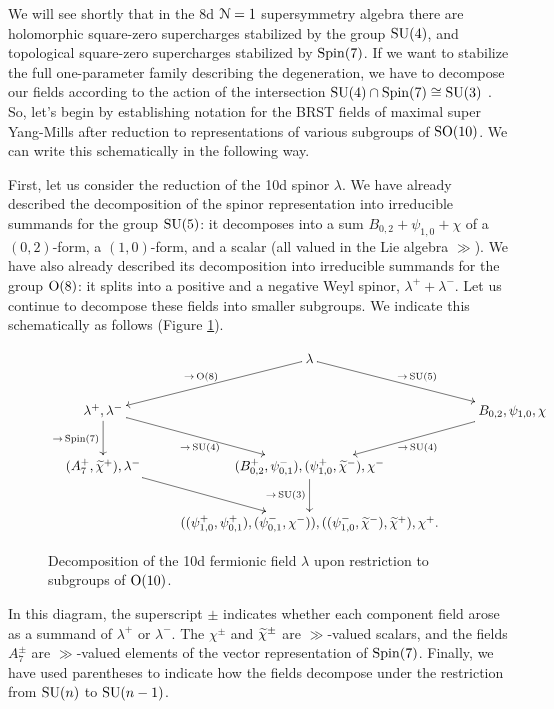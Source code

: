 \documentclass[10pt, oneside]{article}
\begin{document}
We will see shortly that in the 8d $\mathcal{N}=1$ supersymmetry algebra there are holomorphic square-zero supercharges stabilized by the group $\mathrm{SU}(4)$, and topological square-zero supercharges stabilized by $\mathrm{Spin}(7)$.  If we want to stabilize the full one-parameter family describing the degeneration, we have to decompose our fields according to the action of the intersection $\mathrm{SU}(4) \cap \mathrm{Spin}(7) \cong \mathrm{SU}(3)$ .  So, let's begin by establishing notation for the BRST fields of maximal super Yang-Mills after reduction to representations of various subgroups of $\mathrm{SO}(10)$.  We can write this schematically in the following way.

First, let us consider the reduction of the 10d spinor $\lambda$.  We have already described the decomposition of the spinor representation into irreducible summands for the group $\mathrm{SU}(5)$: it decomposes into a sum $B_{0,2} + \psi_{1,0} + \chi$ of a $(0,2)$-form, a $(1,0)$-form, and a scalar (all valued in the Lie algebra $\gg$).  We have also already described its decomposition into irreducible summands for the group $\mathrm{O}(8)$: it splits into a positive and a negative Weyl spinor, $\lambda^+ + \lambda^-$.  Let us continue to decompose these fields into smaller subgroups.  We indicate this schematically as follows (Figure \ref{fig:8dfermiondecomp}).
\begin{figure}[!h]
\[
\xymatrix{
&\lambda \ar[dl]_{\to\,  \mr{O}(8)} \ar[dr]^{\to\,  \SU(5)} &\\
\lambda^+, \lambda^- \ar[dr]_{\to\,  \SU(4)} \ar[d]_{\to\,  \Spin(7)} &&B_{0,2}, \psi_{1,0}, \chi \ar[dl]^{\to\,  \SU(4)} \\
(A_7^+, \wt \chi^+), \lambda^- \ar[dr] &(B_{0,2}^+, \psi_{0,1}^-), (\psi_{1,0}^+, \wt \chi^-), \chi^- \ar[d]_{\to\,  \SU(3)} &\\
 &((\psi_{1,0}^+, \psi_{0,1}^+), (\psi_{0,1}^-, \chi^-)), ((\psi_{1,0}^-, \wt \chi^-), \wt \chi^+), \chi^+. &
}\]
\caption{Decomposition of the 10d fermionic field $\lambda$ upon restriction to subgroups of $\mathrm{O}(10)$.}
\label{fig:8dfermiondecomp}
\end{figure}
In this diagram, the superscript $\pm$ indicates whether each component field arose as a summand of $\lambda^+$ or $\lambda^-$.  The $\chi^\pm$ and $\widetilde{\chi}^\pm$ are $\gg$-valued scalars, and the fields $A_7^\pm$ are $\gg$-valued elements of the vector representation of $\mathrm{Spin}(7)$.  Finally, we have used parentheses to indicate how the fields decompose under the restriction from $\mathrm{SU}(n)$ to $\mathrm{SU}(n-1)$.
\end{document}
